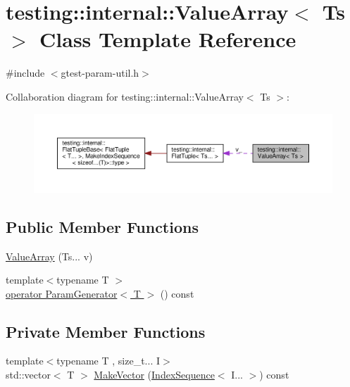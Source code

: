 \hypertarget{classtesting_1_1internal_1_1ValueArray}{}\section{testing\+:\+:internal\+:\+:Value\+Array$<$ Ts $>$ Class Template Reference}
\label{classtesting_1_1internal_1_1ValueArray}


{\ttfamily \#include $<$gtest-\/param-\/util.\+h$>$}



Collaboration diagram for testing\+:\+:internal\+:\+:Value\+Array$<$ Ts $>$\+:\nopagebreak
\begin{figure}[H]
\begin{center}
\leavevmode
\includegraphics[width=350pt]{classtesting_1_1internal_1_1ValueArray__coll__graph}
\end{center}
\end{figure}
\subsection*{Public Member Functions}
\begin{DoxyCompactItemize}
\item 
\hyperlink{classtesting_1_1internal_1_1ValueArray_acd7cd6a969a7e95152eac1787c42c9ed}{Value\+Array} (Ts... v)
\item 
{\footnotesize template$<$typename T $>$ }\\\hyperlink{classtesting_1_1internal_1_1ValueArray_a019560f10debdce5f47bb18c0e5261b5}{operator Param\+Generator$<$ T $>$} () const
\end{DoxyCompactItemize}
\subsection*{Private Member Functions}
\begin{DoxyCompactItemize}
\item 
{\footnotesize template$<$typename T , size\+\_\+t... I$>$ }\\std\+::vector$<$ T $>$ \hyperlink{classtesting_1_1internal_1_1ValueArray_a738073a57459083586285f5055aeac19}{Make\+Vector} (\hyperlink{structtesting_1_1internal_1_1IndexSequence}{Index\+Sequence}$<$ I... $>$) const
\end{DoxyCompactItemize}
